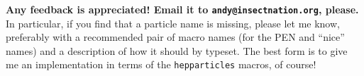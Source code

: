 \documentclass[12pt]{scrartcl}
\newcommand{\texpkg}[1]{\texttt{#1}}
\DeclareRobustCommand{\hepparticles}{\texpkg{hepparticles}\xspace}
\begin{document}
\vspace{1cm}
\noindent
\textbf{Any feedback is appreciated! Email it to \texttt{andy@insectnation.org}, please.}
\newline\newline
In particular, if you find that a particle name is missing, please let me know, 
preferably with a recommended pair of macro names (for the PEN and ``nice'' names)
and a description of how it should by typeset. The best form is to give me an
implementation in terms of the \hepparticles macros, of course!
\end{document}
